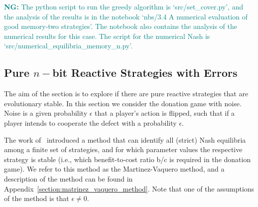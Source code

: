 \documentclass{article}
\theoremstyle{definition}
\newcommand{\nikoleta}[1]{\textcolor{teal}{{\bf NG:} #1}}
\begin{document}
\begin{table}[htbp]
  \centering
\caption{\textbf{Results of greedy algorithm.} The greedy algorithm was used to
find the smallest possible subset of pure memory-two strategies that can
constrain the space of Nash in the case of memory-two strategies. Based on the
approximate solution, the smallest subset is of size
11.}\label{table:greedy_algorithm}
\end{table}

\nikoleta{The python script to run the greedy algorithm is `src/set\_cover.py',
and the analysis of the results is in the
notebook `nbs/3.4 A numerical evaluation of good memory-two strategies'.
The notebook also contains the analysis of the numerical results for this case.
The script for the numerical Nash is `src/numerical\_equilibria\_memory\_n.py'.}

\subsection{Pure \(n-\)bit Reactive Strategies with Errors}\label{section:pure_strategies}

The aim of the section is to explore if there are pure reactive strategies that
are evolutionary stable. In this section we consider the donation game with
noise. Noise is a given probability \(\epsilon\) that a player's action is
flipped, such that if a player intends to cooperate the defect with a
probability \(\epsilon\).

The work of~\citep{hilbe:PNAS:2017} introduced a method that can identify all
(strict) Nash equilibria among a finite set of strategies, and for which
parameter values the respective strategy is stable (i.e., which benefit-to-cost
ratio b/c is required in the donation game). We refer to this method as the
Martinez-Vaquero method, and a description of the method can be found in
Appendix~\ref{section:matrinez_vaquero_method}. Note that one of the assumptions
of the method is that \(\epsilon \neq 0\).
\end{document}
